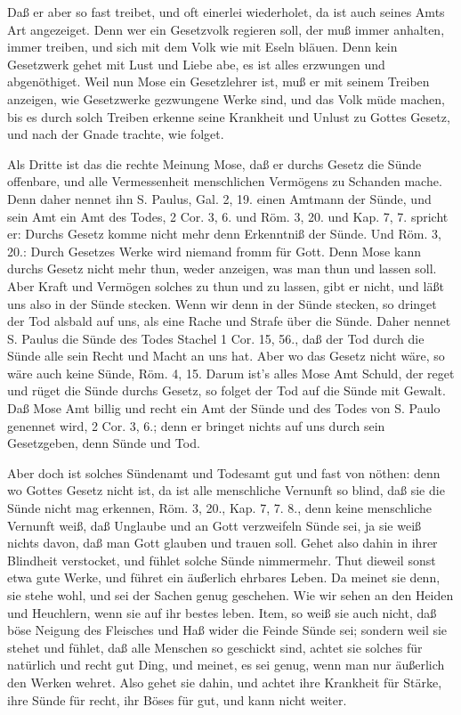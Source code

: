 Daß er aber so fast treibet, und oft einerlei wiederholet, da ist auch seines Amts Art angezeiget. Denn wer ein Gesetzvolk regieren soll, der muß immer anhalten, immer treiben, und sich mit dem Volk wie mit Eseln bläuen. Denn kein Gesetzwerk gehet mit Lust und Liebe abe, es ist alles erzwungen und abgenöthiget. Weil nun Mose ein Gesetzlehrer ist, muß er mit seinem Treiben anzeigen, wie Gesetzwerke gezwungene Werke sind, und das Volk müde machen, bis es durch solch Treiben erkenne seine Krankheit und Unlust zu Gottes Gesetz, und nach der Gnade trachte, wie folget.

Als Dritte ist das die rechte Meinung Mose, daß er durchs Gesetz die Sünde offenbare, und alle Vermessenheit menschlichen Vermögens zu Schanden mache. Denn daher nennet ihn S. Paulus, Gal. 2, 19. einen Amtmann der Sünde, und sein Amt ein Amt des Todes, 2 Cor. 3, 6. und Röm. 3, 20. und Kap. 7, 7. spricht er: Durchs Gesetz komme nicht mehr denn Erkenntniß der Sünde. Und Röm. 3, 20.: Durch Gesetzes Werke wird niemand fromm für Gott. Denn Mose kann durchs Gesetz nicht mehr thun, weder anzeigen, was man thun und lassen soll. Aber Kraft und Vermögen solches zu thun und zu lassen, gibt er nicht, und läßt uns also in der Sünde stecken. Wenn wir denn in der Sünde stecken, so dringet der Tod alsbald auf uns, als eine Rache und Strafe über die Sünde. Daher nennet S. Paulus die Sünde des Todes Stachel 1 Cor. 15, 56., daß der Tod durch die Sünde alle sein Recht und Macht an uns hat. Aber wo das Gesetz nicht wäre, so wäre auch keine Sünde, Röm. 4, 15. Darum ist’s alles Mose Amt Schuld, der reget und rüget die Sünde durchs Gesetz, so folget der Tod auf die Sünde mit Gewalt. Daß Mose Amt billig und recht ein Amt der Sünde und des Todes von S. Paulo genennet wird, 2 Cor. 3, 6.; denn er bringet nichts auf uns durch sein Gesetzgeben, denn Sünde und Tod.

Aber doch ist solches Sündenamt und Todesamt gut und fast von nöthen: denn wo Gottes Gesetz nicht ist, da ist alle menschliche Vernunft so blind, daß sie die Sünde nicht mag erkennen, Röm. 3, 20., Kap. 7, 7. 8., denn keine menschliche Vernunft weiß, daß Unglaube und an Gott verzweifeln Sünde sei, ja sie weiß nichts davon, daß man Gott glauben und trauen soll. Gehet also dahin in ihrer Blindheit verstocket, und fühlet solche Sünde nimmermehr. Thut dieweil sonst etwa gute Werke, und führet ein äußerlich ehrbares Leben. Da meinet sie denn, sie stehe wohl, und sei der Sachen genug geschehen. Wie wir sehen an den Heiden und Heuchlern, wenn sie auf ihr bestes leben. Item, so weiß sie auch nicht, daß böse Neigung des Fleisches und Haß wider die Feinde Sünde sei; sondern weil sie stehet und fühlet, daß alle Menschen so geschickt sind, achtet sie solches für natürlich und recht gut Ding, und meinet, es sei genug, wenn man nur äußerlich den Werken wehret. Also gehet sie dahin, und achtet ihre Krankheit für Stärke, ihre Sünde für recht, ihr Böses für gut, und kann nicht weiter.

